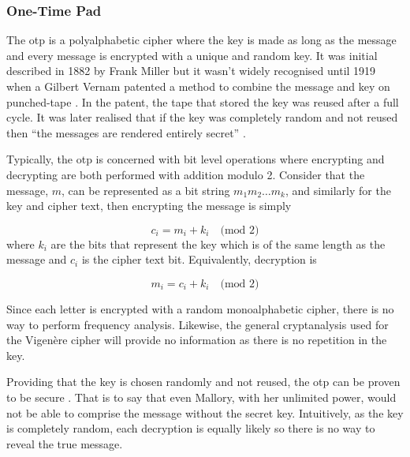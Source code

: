 \subsubsection*{One-Time Pad}


The \ac{otp} is a polyalphabetic cipher where the key is made as long as the message and every message is encrypted with a unique and random key. It was initial described in 1882 by Frank Miller \cite{miller1882telegraphic} but it wasn't widely recognised until 1919 when a Gilbert Vernam patented a method to combine the message and key on punched-tape \cite{vernam1919}. In the patent, the tape that stored the key was reused after a full cycle. It was later realised that if the key was completely random and not reused then ``the messages are rendered entirely secret'' \cite{vernam1926cipher}. 

Typically, the \ac{otp} is concerned with bit level operations where encrypting and decrypting are both performed with addition modulo 2. Consider that the message, $m$, can be represented as a bit string $m_1m_2\ldots m_k$, and similarly for the key and cipher text, then encrypting the message is simply

\begin{equation}
	c_i = m_i + k_i\quad\text{(mod 2)} 
\end{equation}
where $k_i$ are the bits that represent the key which is of the same length as the message and $c_i$ is the cipher text bit. Equivalently, decryption is

\begin{equation}
	m_i = c_i + k_i\quad\text{(mod 2)}
\end{equation}

Since each letter is encrypted with a random monoalphabetic cipher, there is no way to perform frequency analysis. Likewise, the general cryptanalysis used for the Vigen\`{e}re cipher will provide no information as there is no repetition in the key.

Providing that the key is chosen randomly and not reused, the \ac{otp} can be proven to be  secure \cite{shannon1949communication}. That is to say that even Mallory, with her unlimited power, would not be able to comprise the message without the secret key. Intuitively, as the key is completely random, each decryption is equally likely so there is no way to reveal the true message.

